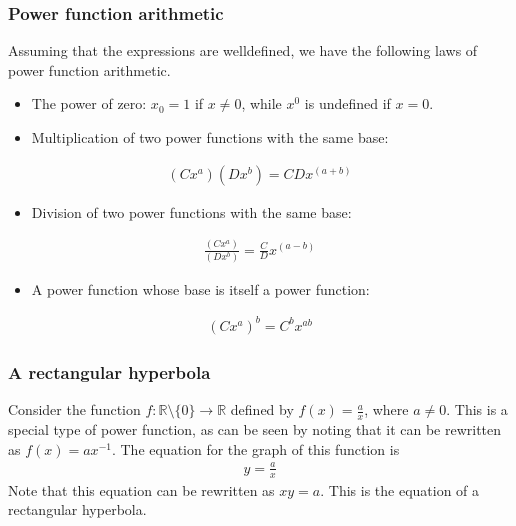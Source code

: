 \documentclass[letterpaper,10pt,english]{jupyterBook}
\begin{document}
\subsubsection{Power function arithmetic}
\label{\detokenize{03.mappings_functions_correspondences:power-function-arithmetic}}
\sphinxAtStartPar
Assuming that the expressions are well\sphinxhyphen{}defined, we have the following laws of power function arithmetic.
\begin{itemize}
\item {} 
\sphinxAtStartPar
The power of zero: \(x_0 = 1\) if \(x \ne 0\), while \(x^0\) is undefined if \(x = 0\).

\item {} 
\sphinxAtStartPar
Multiplication of two power functions with the same base:

\end{itemize}
\begin{equation*}
\begin{split}
(Cx^a)(Dx^b) = CD x^{(a + b)}
\end{split}
\end{equation*}\begin{itemize}
\item {} 
\sphinxAtStartPar
Division of two power functions with the same base:

\end{itemize}
\begin{equation*}
\begin{split}
\frac{(Cx^a)}{(Dx^b)} = \frac{C}{D} x^{(a - b)}
\end{split}
\end{equation*}\begin{itemize}
\item {} 
\sphinxAtStartPar
A power function whose base is itself a power function:

\end{itemize}
\begin{equation*}
\begin{split}
(Cx^a)^b = C^b x^{ab}
\end{split}
\end{equation*}

\subsubsection{A rectangular hyperbola}
\label{\detokenize{03.mappings_functions_correspondences:a-rectangular-hyperbola}}
\sphinxAtStartPar
Consider the function \(f : \mathbb{R} \setminus \{0\} \rightarrow \mathbb{R}\) defined by \(f(x) = \frac{a}{x}\), where \(a \ne 0\). This is a special type of power function, as can be seen by noting that it can be rewritten as \(f(x) = ax^{−1}\). The equation for the graph of this function is
\begin{equation*}
\begin{split}
y = \frac{a}{x}
\end{split}
\end{equation*}
\sphinxAtStartPar
Note that this equation can be rewritten as \(xy = a\). This is the equation of a rectangular hyperbola.
\end{document}
